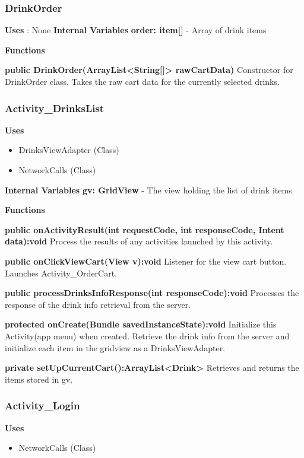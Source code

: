 \documentclass [10pt]{article}
\begin{document}
\subsubsection{DrinkOrder}
\textbf{Uses} : None
\textbf{Internal Variables}
\textbf{order: item[]} - Array of drink items

\textbf{Functions}

\textbf{public DrinkOrder(ArrayList<String[]> rawCartData)}
Constructor for DrinkOrder class. Takes the raw cart data for the currently selected drinks.

\subsubsection{Activity\_DrinksList}

\textbf{Uses}

\begin{itemize}
	\item DrinksViewAdapter (Class)
	\item NetworkCalls (Class)
\end{itemize}

\textbf{Internal Variables}
\textbf{gv: GridView} - The view holding the list of drink items

\textbf{Functions}

\textbf{public onActivityResult(int requestCode, int responseCode, Intent data):void}
Process the results of any activities launched by this activity.

\textbf{public onClickViewCart(View v):void}
Listener for the view cart button. Launches Activity\_OrderCart.

\textbf{public processDrinksInfoResponse(int responseCode):void}
Processes the response of the drink info retrieval from the server.

\textbf{protected onCreate(Bundle savedInstanceState):void}
Initialize this Activity(app menu) when created. Retrieve the drink info from the server and initialize each item in the gridview as a DrinksViewAdapter. 

\textbf{private setUpCurrentCart():ArrayList<Drink>}
Retrieves and returns the items stored in gv.

\subsubsection{Activity\_Login}

\textbf{Uses}

\begin{itemize}
	\item NetworkCalls (Class)
\end{itemize}
\end{document}
